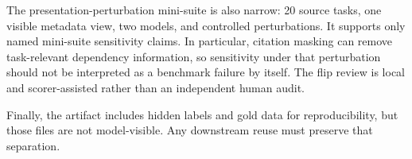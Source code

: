 The presentation-perturbation mini-suite is also narrow: 20 source tasks, one visible metadata view, two models, and controlled perturbations. It supports only named mini-suite sensitivity claims. In particular, citation masking can remove task-relevant dependency information, so sensitivity under that perturbation should not be interpreted as a benchmark failure by itself. The flip review is local and scorer-assisted rather than an independent human audit.

Finally, the artifact includes hidden labels and gold data for reproducibility, but those files are not model-visible. Any downstream reuse must preserve that separation.
